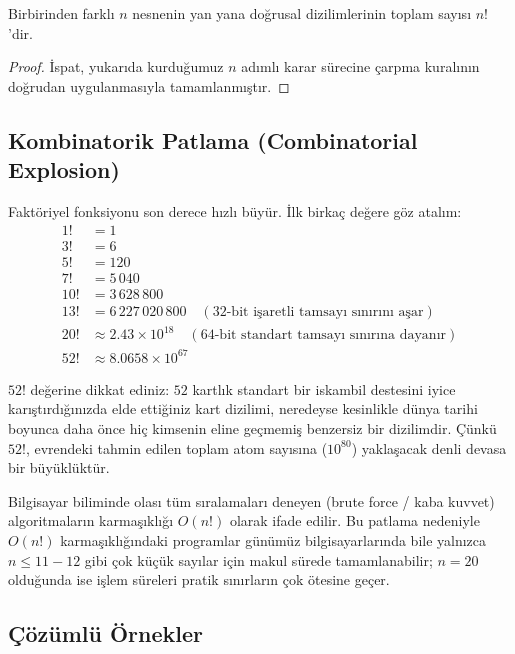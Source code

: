 \begin{theorem}
Birbirinden farklı $n$ nesnenin yan yana doğrusal dizilimlerinin toplam sayısı $n!$'dir.
\end{theorem}
\begin{proof}
İspat, yukarıda kurduğumuz $n$ adımlı karar sürecine çarpma kuralının doğrudan uygulanmasıyla tamamlanmıştır.
\end{proof}

\subsection{Kombinatorik Patlama (Combinatorial Explosion)}

Faktöriyel fonksiyonu son derece hızlı büyür. İlk birkaç değere göz atalım:
\begin{align*}
1! &= 1 \\
3! &= 6 \\
5! &= 120 \\
7! &= 5\,040 \\
10! &= 3\,628\,800 \\
13! &= 6\,227\,020\,800 \quad (\text{32-bit işaretli tamsayı sınırını aşar}) \\
20! &\approx 2.43 \times 10^{18} \quad (\text{64-bit standart tamsayı sınırına dayanır}) \\
52! &\approx 8.0658 \times 10^{67}
\end{align*}

$52!$ değerine dikkat ediniz: $52$ kartlık standart bir iskambil destesini iyice karıştırdığınızda elde ettiğiniz kart dizilimi, neredeyse kesinlikle dünya tarihi boyunca daha önce hiç kimsenin eline geçmemiş benzersiz bir dizilimdir. Çünkü $52!$, evrendeki tahmin edilen toplam atom sayısına ($10^{80}$) yaklaşacak denli devasa bir büyüklüktür.

Bilgisayar biliminde olası tüm sıralamaları deneyen (brute force / kaba kuvvet) algoritmaların karmaşıklığı $O(n!)$ olarak ifade edilir. Bu patlama nedeniyle $O(n!)$ karmaşıklığındaki programlar günümüz bilgisayarlarında bile yalnızca $n \le 11-12$ gibi çok küçük sayılar için makul sürede tamamlanabilir; $n = 20$ olduğunda ise işlem süreleri pratik sınırların çok ötesine geçer.

\subsection{Çözümlü Örnekler}

